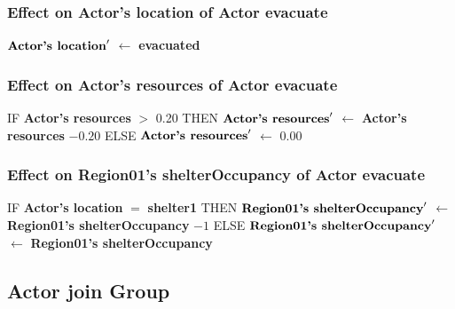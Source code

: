 \documentclass{article}%
\begin{document}
%
\subsubsection{Effect on Actor's location of Actor evacuate}%
\label{ssubsec:Effect on Actor's location of Actor evacuate}%
\begin{flushleft}%
$\mbox{\textbf{Actor's location}} '$%
$\leftarrow$%
\textbf{evacuated}%
\end{flushleft}

%
\subsubsection{Effect on Actor's resources of Actor evacuate}%
\label{ssubsec:Effect on Actor's resources of Actor evacuate}%
\begin{flushleft}%
IF %
\textbf{Actor's resources}%
$>$%
0.20%
\linebreak%
\hspace*{2em}%
THEN %
$\mbox{\textbf{Actor's resources}} '$%
$\leftarrow$%
\textbf{Actor's resources}%
${-}0.20$%
\linebreak%
\hspace*{2em}%
ELSE %
$\mbox{\textbf{Actor's resources}} '$%
$\leftarrow$%
0.00%
\end{flushleft}

%
\subsubsection{Effect on Region01's shelterOccupancy of Actor evacuate}%
\label{ssubsec:Effect on Region01's shelterOccupancy of Actor evacuate}%
\begin{flushleft}%
IF %
\textbf{Actor's location}%
$=$%
\textbf{shelter1}%
\linebreak%
\hspace*{2em}%
THEN %
$\mbox{\textbf{Region01's shelterOccupancy}} '$%
$\leftarrow$%
\textbf{Region01's shelterOccupancy}%
${-}1$%
\linebreak%
\hspace*{2em}%
ELSE %
$\mbox{\textbf{Region01's shelterOccupancy}} '$%
$\leftarrow$%
\textbf{Region01's shelterOccupancy}%
\end{flushleft}

%
\subsection{Actor join Group}%
\label{subsec:Actor join Group}%
\end{document}

